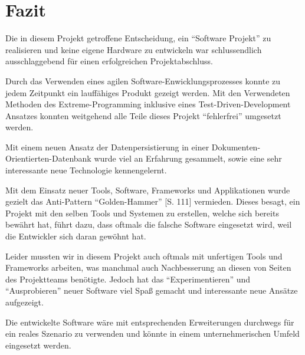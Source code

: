 \section{Fazit}
\label{sec:fazit}

Die in diesem Projekt getroffene Entscheidung, ein ``Software Projekt''
	zu realisieren und keine eigene Hardware zu entwickeln war schlussendlich
	ausschlaggebend für einen erfolgreichen Projektabschluss.
	
Durch das Verwenden eines agilen Software-Enwicklungsprozesses konnte
	zu jedem Zeitpunkt ein lauffähiges Produkt gezeigt werden. Mit
	den Verwendeten Methoden des Extreme-Programming inklusive
	eines Test-Driven-Development Ansatzes konnten weitgehend alle
	Teile dieses Projekt ``fehlerfrei'' umgesetzt werden.
	
Mit einem neuen Ansatz der Datenpersistierung in einer
	Dokumenten-Orientierten-Datenbank wurde viel an Erfahrung gesammelt,
	sowie eine sehr interessante neue Technologie kennengelernt.
	
Mit dem Einsatz neuer Tools, Software, Frameworks und Applikationen
	wurde gezielt das Anti-Pattern ``Golden-Hammer'' \cite{Brown98}[S. 111]
	vermieden. Dieses besagt, ein Projekt mit den selben Tools und Systemen
	zu erstellen, welche sich bereits bewährt hat, führt dazu, dass oftmals
	die falsche Software eingesetzt wird, weil die Entwickler sich daran
	gewöhnt hat.
	
Leider mussten wir in diesem Projekt auch oftmals mit unfertigen Tools
	und Frameworks arbeiten, was manchmal auch Nachbesserung an diesen
	von Seiten des Projektteams benötigte. Jedoch hat das
	``Experimentieren'' und ``Ausprobieren'' neuer Software viel Spaß
	gemacht und interessante neue Ansätze aufgezeigt.
	
Die entwickelte Software wäre mit entsprechenden Erweiterungen durchwegs
	für ein reales Szenario zu verwenden und könnte in einem
	unternehmerischen Umfeld eingesetzt werden.
